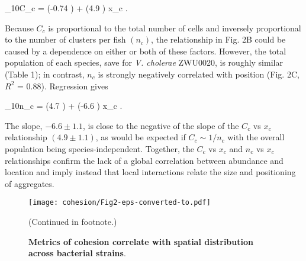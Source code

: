 \be
        	 \log_{10}C_c = (-0.74 ) + (4.9 ) x_c .
\ee	


Because $C_c$ is proportional to the total number of cells and inversely proportional to the number of clusters per fish $(n_c)$, the relationship in Fig. 2B could be caused by a dependence on either or both of these factors. However, the total population of each species, save for \textit{V. cholerae} ZWU0020, is roughly similar (Table 1); in contrast, $n_c$ is strongly negatively correlated with position (Fig. 2C, $R^2$ = 0.88). Regression gives

\be
        \log_{10}n_c = (4.7 ) + (-6.6 ) x_c .
\ee	

The slope, $-6.6 \pm 1.1$, is close to the negative of the slope of the $C_c$ vs $x_c$ relationship $(4.9 \pm 1.1)$, as would be expected if $C_c \sim 1/n_c$ with the overall population being species-independent. Together, the $C_c$ vs $x_c$  and $n_c$ vs $x_c$ relationships confirm the lack of a global correlation between abundance and location and imply instead that local interactions relate the size and positioning of aggregates. 	

\begin{figure}%
	\centerline{
		\texttt{[image: cohesion/Fig2-eps-converted-to.pdf]}}
	\caption{\textbf{Metrics of cohesion correlate with spatial distribution  across bacterial strains}.} {(Continued in footnote.)}
	\label{fig:cohesion_fig2}
\end{figure}

